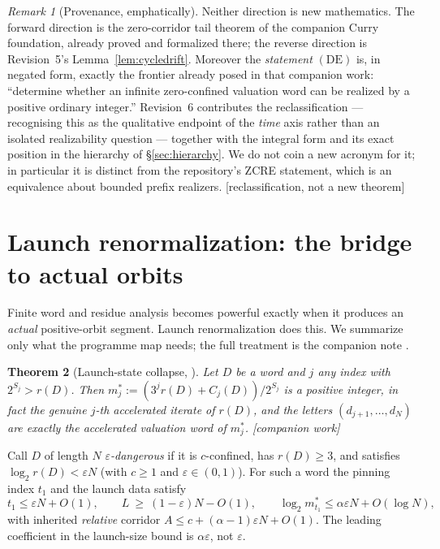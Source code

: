 \documentclass[11pt]{article}
\theoremstyle{plain}
\newtheorem{theorem}{Theorem}[section]
\theoremstyle{definition}
\theoremstyle{remark}
\newtheorem{remark}[theorem]{Remark}
\newcommand{\al}{\alpha}
\newcommand{\status}[1]{\textsf{\footnotesize[#1]}}
\begin{document}
\begin{remark}[Provenance, emphatically]\label{rem:DEprov}
Neither direction is new mathematics. The forward direction is the zero-corridor tail theorem of
the companion Curry foundation, already proved and formalized there; the reverse direction is
Revision~5's Lemma~\ref{lem:cycledrift}. Moreover the \emph{statement} $(\mathrm{DE})$ is, in
negated form, exactly the frontier already posed in that companion work: ``determine whether an
infinite zero-confined valuation word can be realized by a positive ordinary integer.'' Revision~6
contributes the reclassification --- recognising this as the qualitative endpoint of the
\emph{time} axis rather than an isolated realizability question --- together with the integral form
and its exact position in the hierarchy of \S\ref{sec:hierarchy}. We do not coin a new acronym for
it; in particular it is distinct from the repository's ZCRE statement, which is an equivalence
about bounded prefix realizers. \status{reclassification, not a new theorem}
\end{remark}

\section{Launch renormalization: the bridge to actual orbits}\label{sec:launch}

Finite word and residue analysis becomes powerful exactly when it produces an \emph{actual}
positive-orbit segment. Launch renormalization does this. We summarize only what the programme map
needs; the full treatment is the companion note \cite{DJlaunch}.

\begin{theorem}[Launch-state collapse, {\cite{DJlaunch}}]\label{thm:launch}
Let $D$ be a word and $j$ any index with $2^{S_j}>r(D)$. Then
$m^*_j:=(3^j r(D)+C_j(D))/2^{S_j}$ is a positive integer, in fact the genuine $j$-th accelerated
iterate of $r(D)$, and the letters $(d_{j+1},\dots,d_N)$ are exactly the accelerated valuation word
of $m^*_j$. \status{companion work}
\end{theorem}

Call $D$ of length $N$ \emph{$\varepsilon$-dangerous} if it is $c$-confined, has $r(D)\ge3$, and
satisfies $\log_2 r(D)<\varepsilon N$ (with $c\ge1$ and $\varepsilon\in(0,1)$). For such a word the
pinning index $t_1$ and the launch data satisfy
\[
t_1\le\varepsilon N+O(1),\qquad
L\ \ge\ (1-\varepsilon)N-O(1),\qquad
\log_2 m^*_{t_1}\le \al\varepsilon N+O(\log N),
\]
with inherited \emph{relative} corridor $A\le c+(\al-1)\varepsilon N+O(1)$. The leading coefficient
in the launch-size bound is $\al\varepsilon$, not $\varepsilon$.
\end{document}
